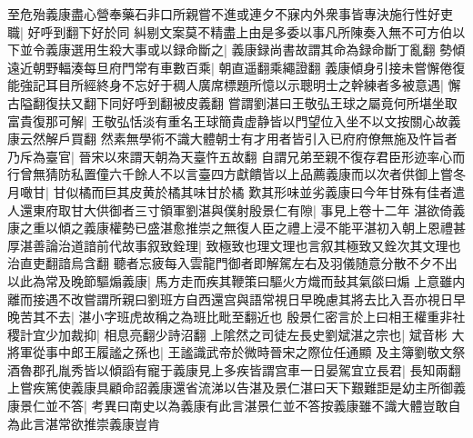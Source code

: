 至危殆義康盡心營奉藥石非口所親嘗不進或連夕不寐内外衆事皆專決施行性好吏職|{
	好呼到翻下好於同}
糾剔文案莫不精盡上由是多委以事凡所陳奏入無不可方伯以下並令義康選用生殺大事或以録命斷之|{
	義康録尚書故謂其命為録命斷丁亂翻}
勢傾遠近朝野輻湊每旦府門常有車數百乘|{
	朝直遥翻乘繩證翻}
義康傾身引接未嘗懈倦復能強記耳目所經終身不忘好于稠人廣席標題所憶以示聰明士之幹練者多被意遇|{
	懈古隘翻復扶又翻下同好呼到翻被皮義翻}
嘗謂劉湛曰王敬弘王球之屬竟何所堪坐取富貴復那可解|{
	王敬弘恬淡有重名王球簡貴虚静皆以門望位入坐不以文按關心故義康云然解戶買翻}
然素無學術不識大體朝士有才用者皆引入已府府僚無施及忤旨者乃斥為臺官|{
	晉宋以來謂天朝為天臺忤五故翻}
自謂兄弟至親不復存君臣形迹率心而行曾無猜防私置僮六千餘人不以言臺四方獻饋皆以上品薦義康而以次者供御上嘗冬月噉甘|{
	甘似橘而巨其皮黄於橘其味甘於橘}
歎其形味並劣義康曰今年甘殊有佳者遣人還東府取甘大供御者三寸領軍劉湛與僕射殷景仁有隙|{
	事見上卷十二年}
湛欲倚義康之重以傾之義康權勢已盛湛愈推崇之無復人臣之禮上浸不能平湛初入朝上恩禮甚厚湛善論治道諳前代故事叙致銓理|{
	致極致也理文理也言叙其極致又銓次其文理也治直吏翻諳烏含翻}
聽者忘疲每入雲龍門御者即解駕左右及羽儀随意分散不夕不出以此為常及晚節驅煽義康|{
	馬方走而疾其鞭策曰驅火方熾而鼔其氣燄曰煽}
上意雖内離而接遇不改嘗謂所親曰劉班方自西還宫與語常視日早晚慮其將去比入吾亦視日早晚苦其不去|{
	湛小字班虎故稱之為班比毗至翻近也}
殷景仁密言於上曰相王權重非社稷計宜少加裁抑|{
	相息亮翻少詩沼翻}
上隂然之司徒左長史劉斌湛之宗也|{
	斌音彬}
大將軍從事中郎王履謐之孫也|{
	王謐識武帝於微時晉宋之際位任通顯}
及主簿劉敬文祭酒魯郡孔胤秀皆以傾謟有寵于義康見上多疾皆謂宫車一日晏駕宜立長君|{
	長知兩翻}
上嘗疾篤使義康具顧命詔義康還省流涕以告湛及景仁湛曰天下艱難詎是幼主所御義康景仁並不答|{
	考異曰南史以為義康有此言湛景仁並不答按義康雖不識大體豈敢自為此言湛常欲推崇義康豈肯}


